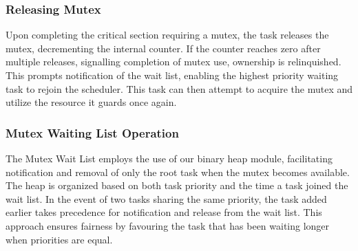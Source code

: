 \subsubsection{Releasing Mutex}
Upon completing the critical section requiring a mutex, the task releases the mutex, decrementing the internal counter. If the counter reaches zero after multiple releases, signalling completion of mutex use, ownership is relinquished. This prompts notification of the wait list, enabling the highest priority waiting task to rejoin the scheduler. This task can then attempt to acquire the mutex and utilize the resource it guards once again.

\subsubsection{Mutex Waiting List Operation}
The Mutex Wait List employs the use of our binary heap module, facilitating notification and removal of only the root task when the mutex becomes available. The heap is organized based on both task priority and the time a task joined the wait list. In the event of two tasks sharing the same priority, the task added earlier takes precedence for notification and release from the wait list. This approach ensures fairness by favouring the task that has been waiting longer when priorities are equal.
